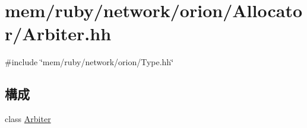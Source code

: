 \hypertarget{Arbiter_8hh}{
\section{mem/ruby/network/orion/Allocator/Arbiter.hh}
\label{Arbiter_8hh}
}
{\ttfamily \#include \char`\"{}mem/ruby/network/orion/Type.hh\char`\"{}}\par
\subsection*{構成}
\begin{DoxyCompactItemize}
\item 
class \hyperlink{classArbiter}{Arbiter}
\end{DoxyCompactItemize}
